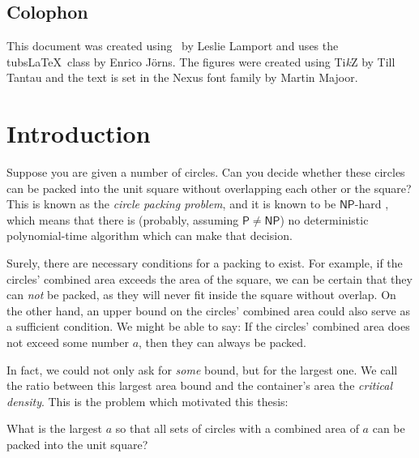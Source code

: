 \documentclass[a4paper,style=print,bibliography=totoc,nexus,lnum,extramargin]{tubsbook}
\begin{document}
\section*{Colophon}

This document was created using \LaTeXe\ by Leslie Lamport and uses the tubs\LaTeX\ class by Enrico Jörns. The figures were created using Ti\textit{k}Z by Till Tantau and the text is set in the Nexus font family by Martin Majoor.

\cleardoublepage
\setcounter{tocdepth}{1}

\tableofcontents
\cleardoublepage

\mainmatter

\chapter{Introduction}

Suppose you are given a number of circles. Can you decide whether these circles can be packed into the unit square without overlapping each other or the square? This is known as the \emph{circle packing problem}, and it is known to be $\mathsf{NP}$-hard \cite{DFL2010circle}, which means that there is (probably, assuming $\mathsf{P} \ne \mathsf{NP}$) no deterministic polynomial-time algorithm which can make that decision.


Surely, there are necessary conditions for a packing to exist. For example, if the circles' combined area exceeds the area of the square, we can be certain that they can \emph{not} be packed, as they will never fit inside the square without overlap.
On the other hand, an upper bound on the circles' combined area could also serve as a sufficient condition. We might be able to say: If the circles' combined area does not exceed some number $a$, then they can always be packed.

In fact, we could not only ask for \emph{some} bound, but for the largest one. We call the ratio between this largest area bound and the container's area the \emph{critical density}. This is the problem which motivated this thesis:

\begin{problem}\label{prb:1}
    What is the largest $a$ so that all sets of circles with a combined area of $a$ can be packed into the unit square?
\end{problem}
\end{document}
